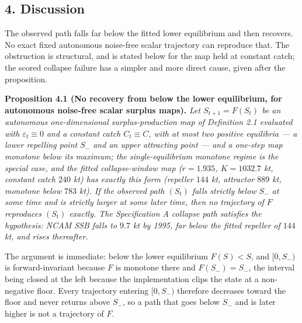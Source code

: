 \documentclass[11pt]{article}
\begin{document}
\subsection{4. Discussion}\label{discussion}

The observed path falls far below the fitted lower equilibrium and then
recovers. No exact fixed autonomous noise-free scalar trajectory can
reproduce that. The obstruction is structural, and is stated below for
the map held at constant catch; the scored collapse failure has a
simpler and more direct cause, given after the proposition.

\textbf{Proposition 4.1 (No recovery from below the lower equilibrium,
for autonomous noise-free scalar surplus maps).} \emph{Let
\(S_{t+1}=F(S_t)\) be an autonomous one-dimensional surplus-production
map of Definition 2.1 evaluated with \(\varepsilon_t \equiv 0\) and a
constant catch \(C_t \equiv C\), with at most two positive equilibria --- a lower
repelling point \(S_-\) and an upper attracting point --- and a one-step
map monotone below its maximum; the single-equilibrium monotone regime
is the special case, and the fitted collapse-window map (\(r = 1.935\),
\(K = 1032.7\) kt, constant catch \(240\) kt) has exactly this form
(repeller \(144\) kt, attractor \(889\) kt, monotone below \(783\) kt).
If the observed path \((S_t)\) falls strictly below \(S_-\) at some
time and is strictly larger at some later time, then no trajectory of
\(F\) reproduces \((S_t)\) exactly. The Specification A collapse path
satisfies the hypothesis: NCAM SSB falls to \(9.7\) kt by 1995, far
below the fitted repeller of \(144\) kt, and rises thereafter. }

The argument is immediate: below the lower equilibrium \(F(S) < S\), and
\([0, S_-)\) is forward-invariant because \(F\) is monotone there and
\(F(S_-) = S_-\), the interval being closed at the left because the
implementation clips the state at a non-negative floor. Every trajectory
entering \([0, S_-)\) therefore decreases toward the floor and never
returns above \(S_-\), so a path that goes below \(S_-\) and is later
higher is not a trajectory of \(F\).
\end{document}
